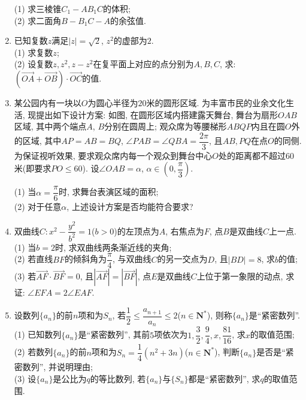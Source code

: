 \documentclass[10pt,a4paper]{article}
\begin{document}
\begin{enumerate}[1.]
\begin{center}
\begin{tikzpicture}[>=latex,scale = 2]
\end{tikzpicture}
\end{center}
(1)	求三棱锥$C_1-AB_1C$的体积;\\
(2) 求二面角$B-B_1C-A$的余弦值.
\item 已知复数$z$满足$|z|=\sqrt 2$, $z^2$的虚部为$2$.\\
(1) 求复数$z$;\\
(2) 设复数$z,z^2,z-z^2$在复平面上对应的点分别为$A,B,C$, 求: $(\overrightarrow{OA}+\overrightarrow{OB})\cdot \overrightarrow{OC}$的值.
\item 某公园内有一块以$O$为圆心半径为$20$米的圆形区域. 为丰富市民的业余文化生活, 现提出如下设计方案: 如图, 在圆形区域内搭建露天舞台, 舞台为扇形$OAB$区域, 其中两个端点$A$, $B$分别在圆周上; 观众席为等腰梯形$ABQP$内且在圆$O$外的区域, 其中$AP=AB=BQ$, $\angle PAB=\angle QBA=\dfrac{2\pi}3$, 且$AB,PQ$在点$O$的同侧. 为保证视听效果, 要求观众席内每一个观众到舞台中心$O$处的距离都不超过$60$米(即要求$PO\le 60$). 设$\angle OAB=\alpha$, $\alpha \in (0, \dfrac{\pi}3)$.
\begin{center}
\end{center}
(1) 当$\alpha =\dfrac{\pi}6$时, 求舞台表演区域的面积;\\
(2) 对于任意$\alpha$, 上述设计方案是否均能符合要求?
\item 双曲线$C:x^2-\dfrac{y^2}{b^2}=1$($b>0$)的左顶点为$A$, 右焦点为$F$, 点$B$是双曲线$C$上一点.\\
(1) 当$b=2$时, 求双曲线两条渐近线的夹角;\\
(2) 若直线$BF$的倾斜角为$\dfrac{\pi}4$, 与双曲线$C$的另一交点为$D$, 且$|BD|=8$, 求$b$的值;\\
(3) 若$\overrightarrow{AF}\cdot \overrightarrow{BF}=0$, 且$|\overrightarrow{AF}|=|\overrightarrow{BF}|$, 点$E$是双曲线$C$上位于第一象限的动点, 求证: $\angle EFA=2\angle EAF$.
\item 设数列$\{a_n\}$的前$n$项和为$S_n$, 若$\dfrac 12\le \dfrac{a_{n+1}}{a_n}\le 2$($n\in \mathbf{N}^*$), 则称$\{a_n\}$是``紧密数列''.\\
(1) 已知数列$\{a_n\}$是``紧密数列'', 其前$5$项依次为$1,\dfrac 32,\dfrac 94,x,\dfrac{81}{16}$, 求$x$的取值范围;\\
(2) 若数列$\{a_n\}$的前$n$项和为$S_n=\dfrac 14(n^2+3n)$($n\in \mathbf{N}^*$), 判断$\{a_n\}$是否是``紧密数列'', 并说明理由;\\
(3) 设$\{a_n\}$是公比为$q$的等比数列, 若$\{a_n\}$与$\{S_n\}$都是``紧密数列'', 求$q$的取值范围.


\end{enumerate}
\end{document}
